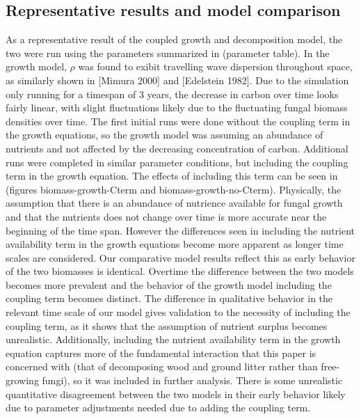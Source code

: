 \documentclass[10pt]{article}
\begin{document}
\subsection*{Representative results and model comparison}
As a representative result of the coupled growth and decomposition model, the two were run using the parameters summarized in (parameter table). In the growth model, $\rho$ was found to exibit travelling wave dispersion throughout space, as similarly shown in [Mimura 2000] and [Edelstein 1982]. Due to the simulation only running for a timespan of 3 years, the decrease in carbon over time looks fairly linear, with slight fluctuations likely due to the fluctuating fungal biomass densities over time. The first initial runs were done without the coupling term in the growth equations, so the growth model was assuming an abundance of nutrients and not affected by the decreasing concentration of carbon. Additional runs were completed in similar parameter conditions, but including the coupling term in the growth equation. The effects of including this term can be seen in (figures biomass-growth-Cterm and biomass-growth-no-Cterm). Physically, the assumption that there is an abundance of nutrience available for fungal growth and that the nutrients does not change over time is more accurate near the beginning of the time span. However the differences seen in including the nutrient availability term in the growth equations become more apparent as longer time scales are considered. Our comparative model results reflect this as early behavior of the two biomasses is identical. Overtime the difference between the two models becomes more prevalent and the behavior of the growth model including the coupling term becomes distinct. The difference in qualitative behavior in the relevant time scale of our model gives validation to the necessity of including the coupling term, as it shows that the assumption of nutrient surplus becomes unrealistic. Additionally, including the nutrient availability term in the growth equation captures more of the fundamental interaction that this paper is concerned with (that of decomposing wood and ground litter rather than free-growing fungi), so it was included in further analysis. There is some unrealistic quantitative disagreement between the two models in their early behavior likely due to parameter adjustments needed  due to adding the coupling term.
\end{document}

